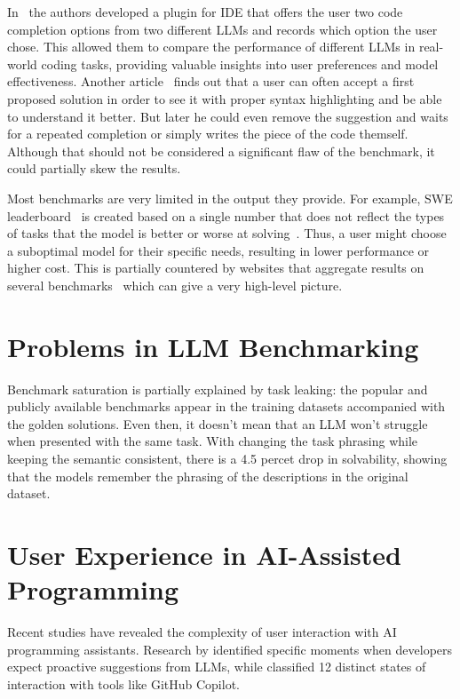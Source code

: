 In~\cite{chi2025copilotarenaplatformcode} the authors developed a plugin for IDE that offers the user two code completion options from two different LLMs and records which option the user chose. This allowed them to compare the performance of different LLMs in real-world coding tasks, providing valuable insights into user preferences and model effectiveness.
Another article~\cite{mozannar2024readinglinesmodelinguser} finds out that a user can often accept a first proposed solution in order to see it with proper syntax highlighting and be able to understand it better. But later he could even remove the suggestion and waits for a repeated completion or simply writes the piece of the code themself. Although that should not be considered a significant flaw of the benchmark, it could partially skew the results.

Most benchmarks are very limited in the output they provide. For example, SWE leaderboard~\cite{swebenchSWEbenchLeaderboards} is created based on a single number that does not reflect the types of tasks that the model is better or worse at solving~\cite{miah2024usercentricevaluationcode}. Thus, a user might choose a suboptimal model for their specific needs, resulting in lower performance or higher cost. This is partially countered by websites that aggregate results on several benchmarks~\cite{vellumLeaderboard2025} which can give a very high-level picture.

\section{Problems in LLM Benchmarking}

Benchmark saturation is partially explained by task leaking: the popular and publicly available benchmarks appear in the training datasets accompanied with the golden solutions. Even then, it doesn't mean that an LLM won't struggle when presented with the same task. With changing the task phrasing while keeping the semantic consistent, there is a 4.5 percet drop in solvability, showing that the models remember the phrasing of the descriptions in the original dataset. \cite{uniyal2024one}


\section{User Experience in AI-Assisted Programming}

Recent studies have revealed the complexity of user interaction with AI programming assistants. Research by \cite{chen2025needhelpdesigningproactive} identified specific moments when developers expect proactive suggestions from LLMs, while \cite{mozannar2024readinglinesmodelinguser} classified 12 distinct states of interaction with tools like GitHub Copilot.

